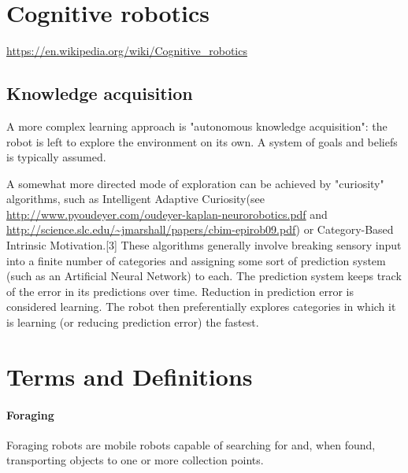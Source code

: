 \documentclass{article}
\begin{document}
   	\section{Cognitive robotics}
   	\url{https://en.wikipedia.org/wiki/Cognitive_robotics}	
   		\subsection{Knowledge acquisition}
   		A more complex learning approach is "autonomous knowledge acquisition": the robot is left to explore the environment on its own. A system of goals and beliefs is typically assumed.
   		
   		A somewhat more directed mode of exploration can be achieved by "curiosity" algorithms, such as Intelligent Adaptive Curiosity(see \url{http://www.pyoudeyer.com/oudeyer-kaplan-neurorobotics.pdf} and \url{http://science.slc.edu/~jmarshall/papers/cbim-epirob09.pdf}) or Category-Based Intrinsic Motivation.[3] These algorithms generally involve breaking sensory input into a finite number of categories and assigning some sort of prediction system (such as an Artificial Neural Network) to each. The prediction system keeps track of the error in its predictions over time. Reduction in prediction error is considered learning. The robot then preferentially explores categories in which it is learning (or reducing prediction error) the fastest.
 	\section{Terms and Definitions} 
 		\paragraph{Foraging} Foraging robots are mobile robots capable of searching for and, when found, transporting objects to one or more collection points.  
 		
	
\end{document}
